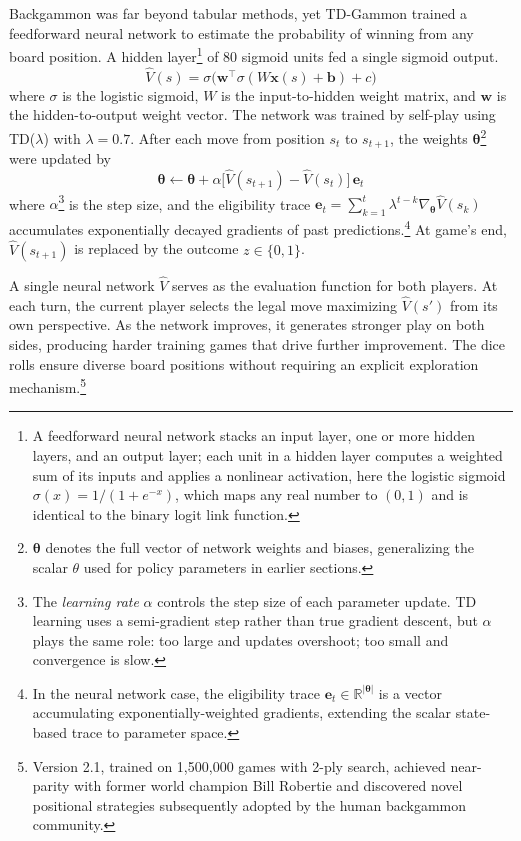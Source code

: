 Backgammon was far beyond tabular methods, yet TD-Gammon trained a feedforward neural network to estimate the probability of winning from any board position. A hidden layer\footnote{A feedforward neural network stacks an input layer, one or more hidden layers, and an output layer; each unit in a hidden layer computes a weighted sum of its inputs and applies a nonlinear activation, here the logistic sigmoid $\sigma(x) = 1/(1+e^{-x})$, which maps any real number to $(0,1)$ and is identical to the binary logit link function.} of 80 sigmoid units fed a single sigmoid output.
\begin{equation}
\hat{V}(s) = \sigma\!\bigl(\mathbf{w}^\top \sigma(W\mathbf{x}(s) + \mathbf{b}) + c\bigr)
\end{equation}
where $\sigma$ is the logistic sigmoid, $W$ is the input-to-hidden weight matrix, and $\mathbf{w}$ is the hidden-to-output weight vector. The network was trained by self-play using TD($\lambda$) with $\lambda = 0.7$. After each move from position $s_t$ to $s_{t+1}$, the weights $\boldsymbol{\theta}$\footnote{$\boldsymbol{\theta}$ denotes the full vector of network weights and biases, generalizing the scalar $\theta$ used for policy parameters in earlier sections.} were updated by
\begin{equation}
\boldsymbol{\theta} \leftarrow \boldsymbol{\theta} + \alpha \bigl[\hat{V}(s_{t+1}) - \hat{V}(s_t)\bigr] \, \mathbf{e}_t
\end{equation}
where $\alpha$\footnote{The \emph{learning rate} $\alpha$ controls the step size of each parameter update. TD learning uses a semi-gradient step rather than true gradient descent, but $\alpha$ plays the same role: too large and updates overshoot; too small and convergence is slow.} is the step size, and the eligibility trace $\mathbf{e}_t = \sum_{k=1}^{t} \lambda^{t-k} \nabla_{\boldsymbol{\theta}} \hat{V}(s_k)$ accumulates exponentially decayed gradients of past predictions.\footnote{In the neural network case, the eligibility trace $\mathbf{e}_t \in \mathbb{R}^{|\boldsymbol{\theta}|}$ is a vector accumulating exponentially-weighted gradients, extending the scalar state-based trace to parameter space.} At game's end, $\hat{V}(s_{t+1})$ is replaced by the outcome $z \in \{0, 1\}$.

A single neural network $\hat{V}$ serves as the evaluation function for both players. At each turn, the current player selects the legal move maximizing $\hat{V}(s')$ from its own perspective. As the network improves, it generates stronger play on both sides, producing harder training games that drive further improvement. The dice rolls ensure diverse board positions without requiring an explicit exploration mechanism.\footnote{Version 2.1, trained on 1,500,000 games with 2-ply search, achieved near-parity with former world champion Bill Robertie and discovered novel positional strategies subsequently adopted by the human backgammon community.} 

